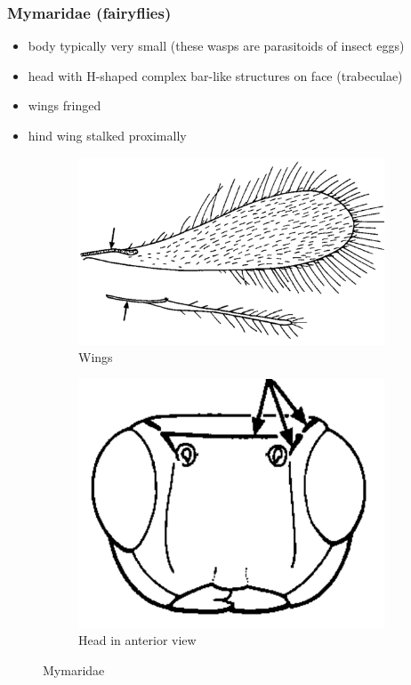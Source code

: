 \documentclass[letterpaper, 11pt]{article}
\begin{document}
\subsubsection{Mymaridae (fairyflies)}
\begin{itemize}
\item body typically very small (these wasps are parasitoids of insect eggs)
\item head with H-shaped complex bar-like structures on face (trabeculae)
\item wings fringed
\item hind wing stalked proximally
\end{itemize}

\begin{figure}[ht!]
  \centering
\begin{subfigure}[ht!]{0.5\textwidth}
    \includegraphics[width=\textwidth]{MymaridWings}
  \caption{Wings}
  \label{fig:mymarid1}
\end{subfigure}
    \qquad
\begin{subfigure}[ht!]{0.28\textwidth}
    \includegraphics[width=\textwidth]{MymaridHead}
  \caption{Head in anterior view}
  \label{fig:mymarid2}
\end{subfigure}
    \caption{Mymaridae \citep[][pg. 87]{goulet1993hymenoptera}}\label{fig:mymarids}
\end{figure}
\end{document}
